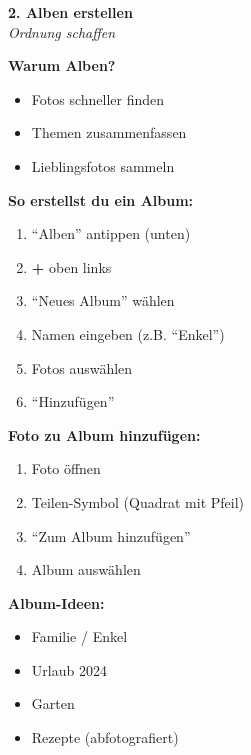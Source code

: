 \documentclass[a4paper,landscape,8pt]{extarticle}
\begin{document}
\hfill%
\begin{minipage}[t]{0.32\linewidth}
\begin{center}
\colorbox{albumblue!10}{%
\begin{minipage}{0.95\linewidth}
\vspace{2mm}
\begin{center}
{\Large\bfseries\textcolor{albumblue}{2. Alben erstellen}}\\[1pt]
{\footnotesize\itshape Ordnung schaffen}
\end{center}
\vspace{2mm}
\end{minipage}%
}
\end{center}

\vspace{1mm}

\textbf{Warum Alben?}
\begin{itemize}
\item Fotos schneller finden
\item Themen zusammenfassen
\item Lieblingsfotos sammeln
\end{itemize}

\textbf{So erstellst du ein Album:}
\begin{enumerate}
\item ``Alben'' antippen (unten)
\item \textbf{+} oben links
\item ``Neues Album'' wählen
\item Namen eingeben (z.B. ``Enkel'')
\item Fotos auswählen
\item ``Hinzufügen''
\end{enumerate}

\textbf{Foto zu Album hinzufügen:}
\begin{enumerate}
\item Foto öffnen
\item Teilen-Symbol (Quadrat mit Pfeil)
\item ``Zum Album hinzufügen''
\item Album auswählen
\end{enumerate}

\textbf{Album-Ideen:}
\begin{itemize}
\item Familie / Enkel
\item Urlaub 2024
\item Garten
\item Rezepte (abfotografiert)
\end{itemize}

\end{minipage}%
\end{document}
